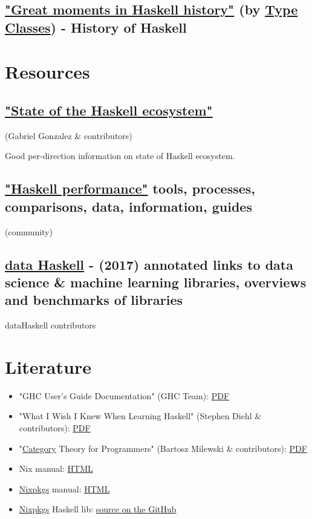 \documentclass[a4paper,14pt,oneside]{book}
\begin{document}
\section{\href{https://typeclasses.com/timeline}{"Great moments in Haskell history"} (by \hyperref[orga64aa94]{Type Classes}) - History of Haskell}
\label{sec:org36d87c0}

\chapter{Resources}
\label{sec:org4d34f69}

\section{\href{https://github.com/Gabriel439/post-rfc/blob/master/sotu.md}{"State of the Haskell ecosystem"}}
\label{sec:orgb1be47f}
(Gabriel Gonzalez \& contributors)

Good per-direction information on state of Haskell ecosystem.

\section{\href{https://github.com/haskell-perf}{"Haskell performance"} tools, processes, comparisons, data, information, guides}
\label{sec:org05b16a0}
(community)

\section{\href{http://www.datahaskell.org/docs}{data Haskell} - (2017) annotated links to data science \& machine learning libraries, overviews and benchmarks of libraries}
\label{sec:orgb40bc4f}
dataHaskell contributors

\chapter{Literature}
\label{sec:org0c8d006}

\begin{itemize}
\item "GHC User’s Guide Documentation" (GHC Team): \href{https://downloads.haskell.org/\~ghc/latest/docs/users\_guide.pdf}{PDF}
\item "What I Wish I Knew When Learning Haskell" (Stephen Diehl \& contributors): \href{http://dev.stephendiehl.com/hask/tutorial.pdf}{PDF}
\item "\hyperref[orge7bc254]{Category} Theory for Programmers" (Bartosz Milewski \& contributors): \href{https://s3.amazonaws.com/milewski-ctfp-pdf/category-theory-for-programmers.pdf}{PDF}
\item Nix manual: \href{https://nixos.org/nix/manual/}{HTML}
\item \hyperref[org9022e55]{Nixpkgs} manual: \href{https://nixos.org/nixpkgs/manual/}{HTML}
\item \hyperref[org9022e55]{Nixpkgs} Haskell lib: \href{https://github.com/NixOS/nixpkgs/blob/master/pkgs/development/haskell-modules/lib.nix}{source on the GitHub}
\end{itemize}
\end{document}
